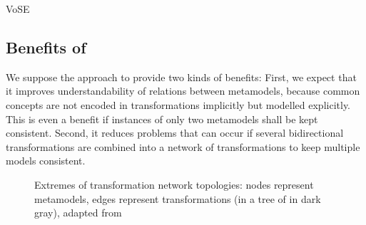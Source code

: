 \begin{copiedFrom}{VoSE}
\subsection{Benefits of \commonalities}
\label{sec:approach:benefits}

We suppose the \commonalities approach to provide two kinds of benefits:
First, we expect that it improves understandability of relations between metamodels, because common concepts are not encoded in transformations implicitly but modelled explicitly.
This is even a benefit if instances of only two metamodels shall be kept consistent.
Second, it reduces problems that can occur if several bidirectional transformations are combined into a network of transformations to keep multiple models consistent.


\begin{figure}
    \centering
    \begin{minipage}[b]{0.4\columnwidth}
        \centering
        
        \vspace{-1em}
        \label{fig:quality:topologies:full}
    \end{minipage}
    \hspace{2em}
    \begin{minipage}[b]{0.4\columnwidth}
        \centering
        
        \label{fig:quality:topologies:tree}
    \end{minipage}
    \caption{Extremes of transformation network topologies: nodes represent metamodels, edges represent transformations (\conceptmetamodels in a tree of \commonalities in dark gray), adapted from \cite{klare2018docsym}}
    \label{fig:quality:topologies}
\end{figure}


\end{copiedFrom}
